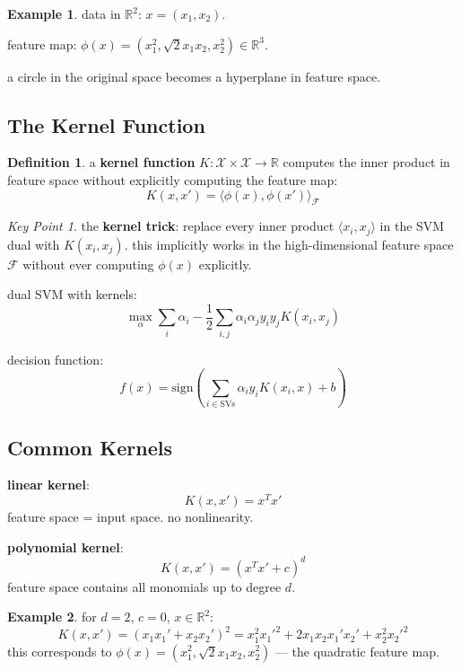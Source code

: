 \documentclass[11pt,a4paper]{article}
\theoremstyle{definition}
\newtheorem{definition}{Definition}[section]
\newtheorem{example}{Example}[section]
\theoremstyle{remark}
\newtheorem*{keypoint}{Key Point}
\begin{document}
\begin{example}
data in $\mathbb{R}^2$: $x = (x_1, x_2)$.

feature map: $\phi(x) = (x_1^2, \sqrt{2}x_1 x_2, x_2^2) \in \mathbb{R}^3$.

a circle in the original space becomes a hyperplane in feature space.
\end{example}

\subsection{The Kernel Function}

\begin{definition}
a \textbf{kernel function} $K: \mathcal{X} \times \mathcal{X} \to \mathbb{R}$ computes the inner product in feature space without explicitly computing the feature map:
\[
\boxed{K(x, x') = \langle \phi(x), \phi(x') \rangle_{\mathcal{F}}}
\]
\end{definition}

\begin{keypoint}
the \textbf{kernel trick}: replace every inner product $\langle x_i, x_j \rangle$ in the SVM dual with $K(x_i, x_j)$. this implicitly works in the high-dimensional feature space $\mathcal{F}$ without ever computing $\phi(x)$ explicitly.

dual SVM with kernels:
\[
\max_\alpha \sum_i \alpha_i - \frac{1}{2}\sum_{i,j} \alpha_i \alpha_j y_i y_j K(x_i, x_j)
\]

decision function:
\[
f(x) = \text{sign}\left(\sum_{i \in \text{SVs}} \alpha_i y_i K(x_i, x) + b\right)
\]
\end{keypoint}

\subsection{Common Kernels}

\textbf{linear kernel}:
\[
K(x, x') = x^T x'
\]
feature space = input space. no nonlinearity.

\textbf{polynomial kernel}:
\[
K(x, x') = (x^T x' + c)^d
\]
feature space contains all monomials up to degree $d$.

\begin{example}
for $d = 2$, $c = 0$, $x \in \mathbb{R}^2$:
\[
K(x, x') = (x_1 x_1' + x_2 x_2')^2 = x_1^2 {x_1'}^2 + 2x_1 x_2 x_1' x_2' + x_2^2 {x_2'}^2
\]
this corresponds to $\phi(x) = (x_1^2, \sqrt{2}x_1 x_2, x_2^2)$ --- the quadratic feature map.
\end{example}
\end{document}
